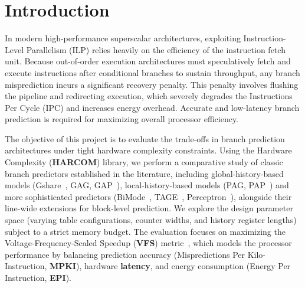 \documentclass[11pt,a4paper,twocolumn]{article}
\begin{document}



\section{Introduction}
\label{sec:introduction}

In modern high-performance superscalar architectures, exploiting Instruction-Level Parallelism (ILP) relies heavily on the efficiency of the instruction fetch unit. Because out-of-order execution architectures must speculatively fetch and execute instructions after conditional branches to sustain throughput, any branch misprediction incurs a significant recovery penalty. This penalty involves flushing the pipeline and redirecting execution, which severely degrades the Instructions Per Cycle (IPC) and increases energy overhead. Accurate and low-latency branch prediction is required for maximizing overall processor efficiency.

The objective of this project is to evaluate the trade-offs in branch prediction architectures under tight hardware complexity constraints. Using the Hardware Complexity (\textbf{HARCOM}) library, we perform a comparative study of classic branch predictors established in the literature, including global-history-based models (Gshare~\cite{McFarling1993}, GAG, GAP~\cite{Yeh1991TwolevelAT}), local-history-based models (PAG, PAP~\cite{Yeh1991TwolevelAT}) and more sophisticated predictors (BiMode~\cite{lee1997bimode}, TAGE~\cite{seznec2006case}, Perceptron~\cite{jimenez2001dynamic}), alongside their line-wide extensions for block-level prediction. We explore the design parameter space (varying table configurations, counter widths, and history register lengths) subject to a strict memory budget. The evaluation focuses on maximizing the Voltage-Frequency-Scaled Speedup (\textbf{VFS}) metric~\cite{michaudvfs}, which models the processor performance by balancing prediction accuracy (Mispredictions Per Kilo-Instruction, \textbf{MPKI}), hardware \textbf{latency}, and energy consumption (Energy Per Instruction, \textbf{EPI}). 
\end{document}
